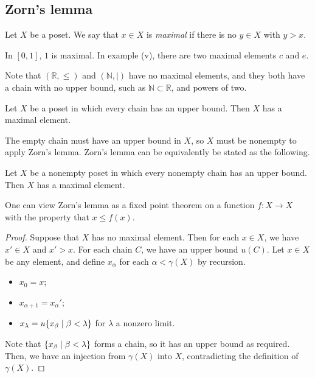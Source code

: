 \subsection{Zorn's lemma}
\begin{definition}
    Let \( X \) be a poset.
    We say that \( x \in X \) is \emph{maximal} if there is no \( y \in X \) with \( y > x \).
\end{definition}
\begin{example}
    In \( [0,1] \), \( 1 \) is maximal.
    In example (v), there are two maximal elements \( c \) and \( e \).
\end{example}
Note that \( (\mathbb R, \leq) \) and \( (\mathbb N, \mid) \) have no maximal elements, and they both have a chain with no upper bound, such as \( \mathbb N \subset \mathbb R \), and powers of two.
\begin{theorem}
    Let \( X \) be a poset in which every chain has an upper bound.
    Then \( X \) has a maximal element.
\end{theorem}
The empty chain must have an upper bound in \( X \), so \( X \) must be nonempty to apply Zorn's lemma.
Zorn's lemma can be equivalently be stated as the following.
\begin{theorem}
    Let \( X \) be a nonempty poset in which every nonempty chain has an upper bound.
    Then \( X \) has a maximal element.
\end{theorem}
One can view Zorn's lemma as a fixed point theorem on a function \( f \colon X \to X \) with the property that \( x \leq f(x) \).
\begin{proof}
    Suppose that \( X \) has no maximal element.
    Then for each \( x \in X \), we have \( x' \in X \) and \( x' > x \).
    For each chain \( C \), we have an upper bound \( u(C) \).
    Let \( x \in X \) be any element, and define \( x_\alpha \) for each \( \alpha < \gamma(X) \) by recursion.
    \begin{itemize}
        \item \( x_0 = x \);
        \item \( x_{\alpha + 1} = x_\alpha' \);
        \item \( x_\lambda = u\qty{x_\beta \mid \beta < \lambda} \) for \( \lambda \) a nonzero limit.
    \end{itemize}
    Note that \( \qty{x_\beta \mid \beta < \lambda} \) forms a chain, so it has an upper bound as required.
    Then, we have an injection from \( \gamma(X) \) into \( X \), contradicting the definition of \( \gamma(X) \).
\end{proof}
